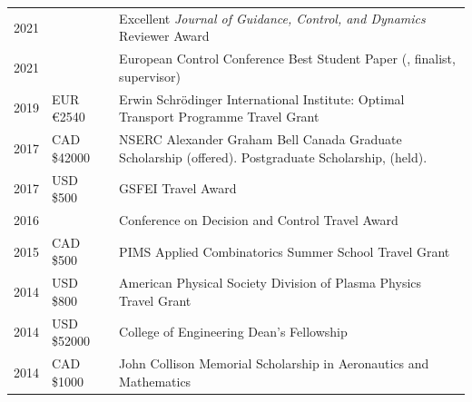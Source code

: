 
\begin{tabular}{p{} p{} p{}}
2021 & & Excellent \textit{Journal of Guidance, Control, and Dynamics} Reviewer Award\\
2021& & European Control Conference Best Student Paper (\cite{ECC1}, finalist, supervisor) \\ 
2019& EUR €2540 & Erwin Schr\"{o}dinger International Institute: Optimal Transport Programme Travel Grant\\
2017 & CAD \$42000 & NSERC Alexander Graham Bell Canada Graduate Scholarship (offered). Postgraduate Scholarship, (held).\\
2017 & USD \$500   & GSFEI Travel Award \\
2016 &             & Conference on Decision and Control Travel Award\\
2015 & CAD \$500   & PIMS Applied Combinatorics Summer School Travel Grant\\
2014 & USD \$800   & American Physical Society Division of Plasma Physics Travel Grant \\
2014 & USD \$52000 & College of Engineering Dean's Fellowship \\
2014 & CAD \$1000  & John Collison Memorial Scholarship in Aeronautics and Mathematics \\
\end{tabular}


